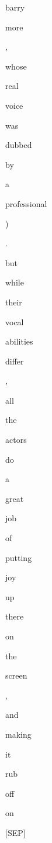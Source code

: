\documentclass[varwidth=150mm]{standalone}
\begin{document}
\begin{CJK*}{UTF8}{gbsn}
{{{\colorbox{red!0.0}{\strut barry}\colorbox{red!0.0}{\strut more} \colorbox{red!0.0}{\strut ,} \colorbox{red!0.0}{\strut whose} \colorbox{red!1.0462560653686523}{\strut real} \colorbox{red!6.610038757324219}{\strut voice} \colorbox{red!1.5077786445617676}{\strut was} \colorbox{red!13.298250198364258}{\strut dubbed} \colorbox{red!0.0}{\strut by} \colorbox{red!0.0}{\strut a} \colorbox{red!0.0}{\strut professional} \colorbox{red!0.0}{\strut )} \colorbox{red!0.0}{\strut .} \colorbox{red!2.00093150138855}{\strut but} \colorbox{red!0.0}{\strut while} \colorbox{red!0.0}{\strut their} \colorbox{red!5.207284450531006}{\strut vocal} \colorbox{red!0.0}{\strut abilities} \colorbox{red!0.0}{\strut differ} \colorbox{red!0.0}{\strut ,} \colorbox{red!0.0}{\strut all} \colorbox{red!1.580714225769043}{\strut the} \colorbox{red!2.0425970554351807}{\strut actors} \colorbox{red!0.0}{\strut do} \colorbox{red!1.8461296558380127}{\strut a} \colorbox{red!1.9753060340881348}{\strut great} \colorbox{red!0.0}{\strut job} \colorbox{red!0.0}{\strut of} \colorbox{red!0.0}{\strut putting} \colorbox{red!0.0}{\strut joy} \colorbox{red!0.0}{\strut up} \colorbox{red!1.2021472454071045}{\strut there} \colorbox{red!0.0}{\strut on} \colorbox{red!0.0}{\strut the} \colorbox{red!2.0081543922424316}{\strut screen} \colorbox{red!0.0}{\strut ,} \colorbox{red!0.0}{\strut and} \colorbox{red!0.0}{\strut making} \colorbox{red!0.0}{\strut it} \colorbox{red!0.0}{\strut rub} \colorbox{red!0.0}{\strut off} \colorbox{red!0.0}{\strut on} \colorbox{red!1.0911945104599}{\strut [SEP]}
}}}
\end{CJK*}
\end{document}
